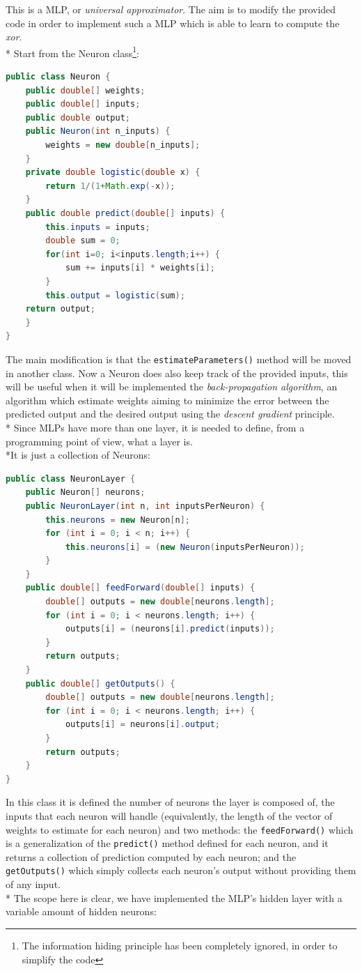 \documentclass[10pt,a4paper]{article}
\begin{document}
This is a MLP, or \emph{universal approximator}. The aim is to modify the provided code in order to implement such a MLP which is able to learn to compute the \emph{xor}.\\*
Start from the Neuron class\footnote{The information hiding principle has been completely ignored, in order to simplify the code}:
\begin{lstlisting}[language=Java]
public class Neuron {
	public double[] weights;
	public double[] inputs;
	public double output;
	public Neuron(int n_inputs) {
		weights = new double[n_inputs];
	}
	private double logistic(double x) {
		return 1/(1+Math.exp(-x));
	}
	public double predict(double[] inputs) {
		this.inputs = inputs;
		double sum = 0;
		for(int i=0; i<inputs.length;i++) {
			sum += inputs[i] * weights[i];
		}
		this.output = logistic(sum);
	return output;
	}
}
\end{lstlisting}
The main modification is that the \texttt{estimateParameters()} method will be moved in another class. Now a Neuron does also keep track of the provided inputs, this will be useful when it will be implemented the \emph{back-propagation algorithm}, an algorithm which estimate weights aiming to minimize the error between the predicted output and the desired output using the \emph{descent gradient} principle.\\*
Since MLPs have more than one layer, it is needed to define, from a programming point of view, what a layer is.\\*It is just a collection of Neurons:
\begin{lstlisting}[language=Java]
public class NeuronLayer {
	public Neuron[] neurons;
	public NeuronLayer(int n, int inputsPerNeuron) {
		this.neurons = new Neuron[n];
		for (int i = 0; i < n; i++) {
			this.neurons[i] = (new Neuron(inputsPerNeuron));
		}
	}
	public double[] feedForward(double[] inputs) {
		double[] outputs = new double[neurons.length];
		for (int i = 0; i < neurons.length; i++) {
			outputs[i] = (neurons[i].predict(inputs));
		}
		return outputs;
	}
	public double[] getOutputs() {
		double[] outputs = new double[neurons.length];
		for (int i = 0; i < neurons.length; i++) {
			outputs[i] = neurons[i].output;
		}
		return outputs;
	}
}
\end{lstlisting}
In this class it is defined the number of neurons the layer is composed of, the inputs that each neuron will handle (equivalently, the length of the vector of weights to estimate for each neuron) and two methods: the \texttt{feedForward()} which is a generalization of the \texttt{predict()} method defined for each neuron, and it returns a collection of prediction computed by each neuron; and the \texttt{getOutputs()} which simply collects each neuron's output without providing them of any input.\\* The scope here is clear, we have implemented the MLP's hidden layer with a variable amount of hidden neurons:
\end{document}
